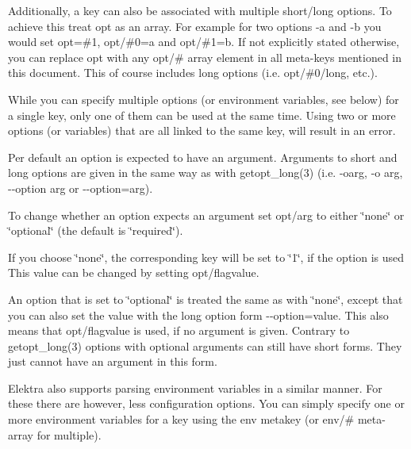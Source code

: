 Additionally, a key can also be associated with multiple short/long options. To achieve this treat {\ttfamily opt} as an array. For example for two options {\ttfamily -\/a} and {\ttfamily -\/b} you would set {\ttfamily opt=\#1}, {\ttfamily opt/\#0=a} and {\ttfamily opt/\#1=b}. If not explicitly stated otherwise, you can replace {\ttfamily opt} with any {\ttfamily opt/\#} array element in all meta-\/keys mentioned in this document. This of course includes long options (i.\+e. {\ttfamily opt/\#0/long}, etc.).

While you can specify multiple options (or environment variables, see below) for a single key, only one of them can be used at the same time. Using two or more options (or variables) that are all linked to the same key, will result in an error.

Per default an option is expected to have an argument. Arguments to short and long options are given in the same way as with {\ttfamily getopt\+\_\+long(3)} (i.\+e. {\ttfamily -\/oarg}, {\ttfamily -\/o arg}, {\ttfamily -\/-\/option arg} or {\ttfamily -\/-\/option=arg}).

To change whether an option expects an argument set {\ttfamily opt/arg} to either {\ttfamily \char`\"{}none\char`\"{}} or {\ttfamily \char`\"{}optional\char`\"{}} (the default is {\ttfamily \char`\"{}required\char`\"{}}).


\begin{DoxyItemize}
\item If you choose {\ttfamily \char`\"{}none\char`\"{}}, the corresponding key will be set to {\ttfamily \char`\"{}1\char`\"{}}, if the option is used This value can be changed by setting {\ttfamily opt/flagvalue}.
\item An option that is set to {\ttfamily \char`\"{}optional\char`\"{}} is treated the same as with {\ttfamily \char`\"{}none\char`\"{}}, except that you can also set the value with the long option form {\ttfamily -\/-\/option=value}. This also means that {\ttfamily opt/flagvalue} is used, if no argument is given. Contrary to {\ttfamily getopt\+\_\+long(3)} options with optional arguments can still have short forms. They just cannot have an argument in this form.
\end{DoxyItemize}

Elektra also supports parsing environment variables in a similar manner. For these there are however, less configuration options. You can simply specify one or more environment variables for a key using the {\ttfamily env} metakey (or {\ttfamily env/\#} meta-\/array for multiple).

